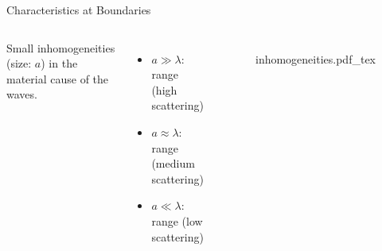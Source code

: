 \begin{frame}{Characteristics at Boundaries \cont}

    \begin{columns}[T]
        Small inhomogeneities (size: $a$) in the material cause  of the waves.

        \vspace{.5cm}
        \begin{itemize}
            \item $a \gg \lambda$:  range (high scattering)\\\hspace{2.5cm}{ $\rightarrow$ Vessels}\vspace{.5cm}
            \item $a \approx \lambda$:  range (medium scattering)\\\hspace{2.5cm}{ $\rightarrow$ Liver}\vspace{.5cm}
            \item $a \ll \lambda$:  range (low scattering)\\\hspace{2.5cm}{ $\rightarrow$ Blood}
        \end{itemize}

        \begin{figure}
            \def\svgwidth{0.9\columnwidth}
            {inhomogeneities.pdf_tex}
        \end{figure}
    \end{columns}

\end{frame}



